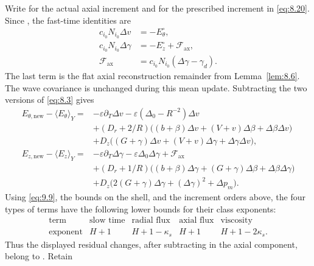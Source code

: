 Write  for the actual axial increment and
 for the prescribed increment in \eqref{eq:8.20}. Since
, the fast-time identities are
\[
\begin{aligned}
c_{i_0}N_{i_0}\Delta v&=-E_\theta^\circ,\\
c_{i_0}N_{i_0}\Delta\gamma&=-E_z^\circ+\mathcal F_{\mathrm{ax}},\\
\mathcal F_{\mathrm{ax}}&=c_{i_0}N_{i_0}(\Delta\gamma-\gamma_d).
\end{aligned}
\]
The last term is the flat axial reconstruction remainder from Lemma~\ref{lem:8.6}. The wave
covariance is unchanged during this mean update. Subtracting the two versions of \eqref{eq:8.3}
gives
\[
\begin{aligned}
E_{\theta,\mathrm{new}}-\langle E_\theta\rangle_Y
  ={}&-\varepsilon\partial_T\Delta v-\varepsilon(\Delta_0-R^{-2})\Delta v\\
     &+(D_r+2/R)\bigl((b+\beta)\Delta v+(V+v)\Delta\beta+\Delta\beta\Delta v\bigr)\\
     &+D_z\bigl((G+\gamma)\Delta v+(V+v)\Delta\gamma+\Delta\gamma\Delta v\bigr),\\
E_{z,\mathrm{new}}-\langle E_z\rangle_Y
  ={}&-\varepsilon\partial_T\Delta\gamma-\varepsilon\Delta_0\Delta\gamma+\mathcal F_{\mathrm{ax}}\\
     &+(D_r+1/R)\bigl((b+\beta)\Delta\gamma+(G+\gamma)\Delta\beta+\Delta\beta\Delta\gamma\bigr)\\
     &+D_z\bigl(2(G+\gamma)\Delta\gamma+(\Delta\gamma)^2+\Delta p_m\bigr).
\end{aligned}
\]
Using \eqref{eq:9.9}, the bounds
 on the shell, and the increment orders
above, the four types of terms have the following lower bounds for their class exponents:
\[
\begin{array}{c|cccc}
\text{term} & \text{slow time} & \text{radial flux} & \text{axial flux} & \text{viscosity}\\ \hline
\text{exponent} & H+1 & H+1-\kappa_s & H+1 & H+1-2\kappa_s.
\end{array}
\]
Thus the displayed residual changes, after subtracting 
in the axial component, belong to . Retain
